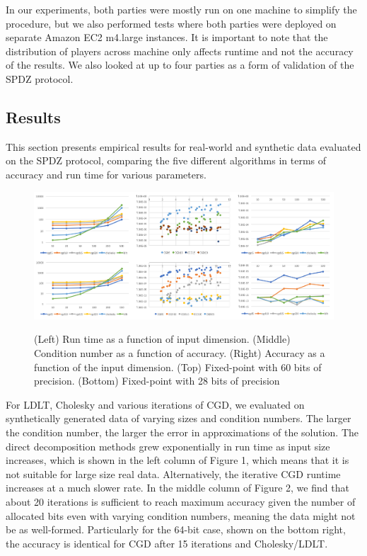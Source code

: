 \documentclass{article}
\begin{document}
In our experiments, both parties were mostly run on one machine to simplify the procedure, but we also performed tests where both parties were deployed on separate Amazon EC2 m4.large instances. It is important to note that the distribution of players across machine only affects runtime and not the accuracy of the results. We also looked at up to four parties as a form of validation of the SPDZ protocol.

\subsection{Results}

This section presents empirical results for real-world and synthetic data evaluated on the SPDZ protocol, comparing the five different algorithms in terms of accuracy and run time for various parameters. 

\begin{figure}[h!]
\centering
  \includegraphics[scale=0.4]{allregression.png}
  \label{fig:result4}
    \caption{(Left) Run time as a function of input dimension. (Middle) Condition number as a function of accuracy. (Right) Accuracy as a function of the input dimension. (Top) Fixed-point with 60 bits of precision. (Bottom) Fixed-point with 28 bits of precision}
\end{figure}

For LDLT, Cholesky and various iterations of CGD, we evaluated on synthetically generated data of varying sizes and condition numbers. The larger the condition number, the larger the error in approximations of the solution. The direct decomposition methods grew exponentially in run time as input size increases, which is shown in the left column of Figure 1, which means that it is not suitable for large size real data. Alternatively, the iterative CGD runtime increases at a much slower rate. In the middle column of Figure 2, we find that about 20 iterations is sufficient to reach maximum accuracy given the number of allocated bits even with varying condition numbers, meaning the data might not be as well-formed. Particularly for the 64-bit case, shown on the bottom right, the accuracy is identical for CGD after 15 iterations and Cholesky/LDLT.
\end{document}
